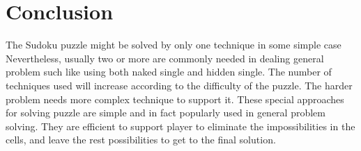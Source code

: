 \documentclass[11pt]{report}
\begin{document}
\chapter{Conclusion}
\label{sec:Conclusion}
The Sudoku puzzle might be solved by only one technique in some simple case Nevertheless, usually two or more are commonly needed in dealing general problem such like using both naked single and hidden single. The number of techniques used will increase according to the difficulty of the puzzle. The harder problem needs more complex technique to support it.
These special approaches for solving puzzle are simple and in fact popularly used in general problem solving. They are efficient to support player to eliminate the impossibilities in the cells, and leave the rest possibilities to get to the final solution.





\end{document}
